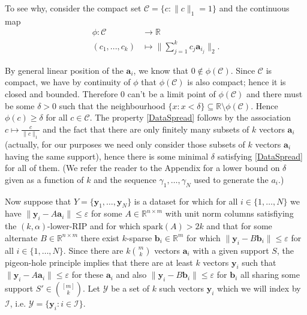 \documentclass[journal,onecolumn]{IEEEtran}
\begin{document}
To see why, consider the compact set $\mathcal{C} = \{c: \|c\|_1 = 1\}$ and the continuous map
\begin{align*}
\phi: \mathcal{C} &\to \mathbb{R} \\
(c_1, ..., c_k) &\mapsto \|\sum_{j = 1}^k c_j \mathbf{a}_{i_j}\|_2.
\end{align*}

By general linear position of the $\mathbf{a}_i$, we know that $0 \notin \phi(\mathcal{C})$. Since $\mathcal{C}$ is compact, we have by continuity of $\phi$ that $\phi(\mathcal{C})$ is also compact; hence it is closed and bounded. Therefore $0$ can't be a limit point of $\phi(\mathcal{C})$ and there must be some $\delta > 0$ such that the neighbourhood $\{x: x < \delta\} \subseteq \mathbb{R} \setminus \phi(\mathcal{C})$. Hence $\phi(c) \geq \delta$ for all $c \in \mathcal{C}$. The property \eqref{DataSpread} follows by the association $c \mapsto \frac{c}{\|c\|_1}$ and the fact that there are only finitely many subsets of $k$ vectors $\mathbf{a}_i$ (actually, for our purposes we need only consider those subsets of $k$ vectors $\mathbf{a}_i$ having the same support), hence there is some minimal $\delta$ satisfying \eqref{DataSpread} for all of them. (We refer the reader to the Appendix for a lower bound on $\delta$ given as a function of $k$ and the sequence $\gamma_1, \ldots, \gamma_N$ used to generate the $a_i$.)

Now suppose that $Y = \{\mathbf{y}_1, \ldots, \mathbf{y}_N\}$ is a dataset for which for all $i \in \{1, \ldots, N\}$ we have $\|\mathbf{y}_i - A\mathbf{a}_i\| \leq \varepsilon$ for some $A \in \mathbb{R}^{n \times m}$ with unit norm columns satisfiying the $(k,\alpha)$-lower-RIP and for which $\text{spark}(A) > 2k$ and that for some alternate $B \in \mathbb{R}^{n \times m}$ there exist $k$-sparse $\mathbf{b}_i \in \mathbb{R}^m$ for which $\|\mathbf{y}_i - B\mathbf{b}_i\| \leq \varepsilon$ for all $i \in \{1, \ldots, N\}$. Since there are $k{m \choose k}$ vectors $\mathbf{a}_i$ with a given support $S$, the pigeon-hole principle implies that there are at least $k$ vectors $\mathbf{y}_i$ such that $\|\mathbf{y}_i - A\mathbf{a}_i\| \leq \varepsilon$ for these $\mathbf{a}_i$ and also $\|\mathbf{y}_i - B\mathbf{b}_i\| \leq \varepsilon$ for $\mathbf{b}_i$ all sharing some support $S' \in {[m] \choose k}$. Let $\mathcal{Y}$ be a set of $k$ such vectors $\mathbf{y}_i$ which we will index by $\mathcal{I}$, i.e. $\mathcal{Y} = \{\mathbf{y}_i: i \in \mathcal{I}\}$.
\end{document}
